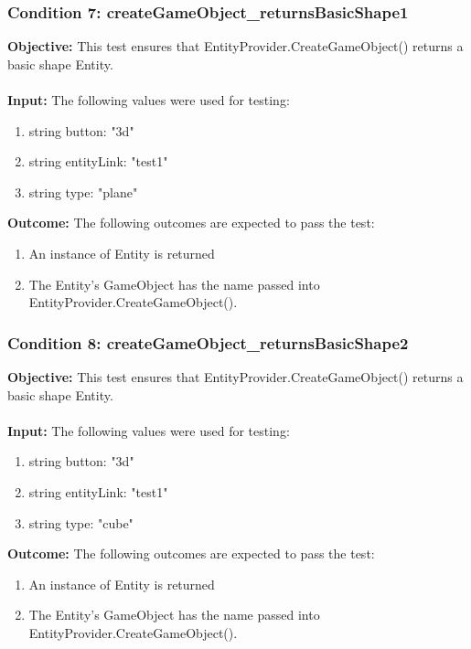 \documentclass[a4paper,12pt]{article}
\begin{document}
		\subsubsection{Condition 7: createGameObject\_returnsBasicShape1}
			\textbf{Objective:} This test ensures that EntityProvider.CreateGameObject() returns a basic shape Entity.\\\\
			\textbf{Input:} The following values were used for testing:
				\begin{enumerate}
					\item string button: "3d"
					\item string entityLink: "test1"
					\item string type: "plane"
				\end{enumerate}
			\textbf{Outcome:} The following outcomes are expected to pass the test:
				\begin{enumerate}
					\item An instance of Entity is returned
					\item The Entity's GameObject has the name passed into EntityProvider.CreateGameObject().
				\end{enumerate}
		\subsubsection{Condition 8: createGameObject\_returnsBasicShape2}
			\textbf{Objective:} This test ensures that EntityProvider.CreateGameObject() returns a basic shape Entity.\\\\
			\textbf{Input:} The following values were used for testing:
				\begin{enumerate}
					\item string button: "3d"
					\item string entityLink: "test1"
					\item string type: "cube"
				\end{enumerate}
			\textbf{Outcome:} The following outcomes are expected to pass the test:
				\begin{enumerate}
					\item An instance of Entity is returned
					\item The Entity's GameObject has the name passed into EntityProvider.CreateGameObject().
				\end{enumerate}
\end{document}
